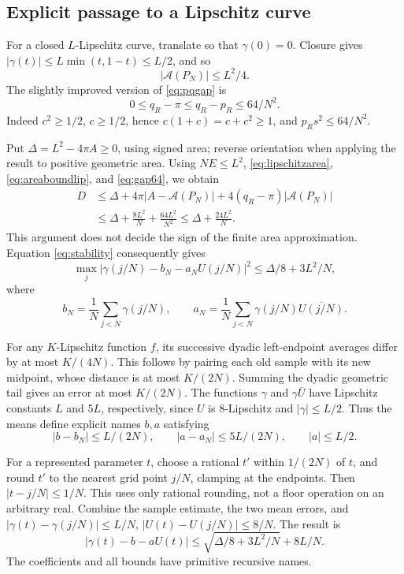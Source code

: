 \documentclass[11pt,a4paper]{article}
\theoremstyle{definition}
\newcommand{\Area}{\mathcal A}
\begin{document}
\subsection{Explicit passage to a Lipschitz curve}
For a closed \(L\)-Lipschitz curve, translate so that \(\gamma(0)=0\).
Closure gives \(|\gamma(t)|\le L\min(t,1-t)\le L/2\), and so
\[
 |\Area(P_N)|\le L^2/4.
 \tag{10.5}\label{eq:areaboundlip}
\]
The slightly improved version of \eqref{eq:pqgap} is
\[
 0\le q_R-\pi\le q_R-p_R\le64/N^2.
 \tag{10.6}\label{eq:gap64}
\]
Indeed \(c^2\ge1/2\), \(c\ge1/2\), hence
\(c(1+c)=c+c^2\ge1\), and \(p_Rs^2\le64/N^2\).

Put \(\Delta=L^2-4\pi A\ge0\), using signed area; reverse
orientation when applying the result to positive geometric area.
Using \(NE\le L^2\), \eqref{eq:lipschitzarea},
\eqref{eq:areaboundlip}, and \eqref{eq:gap64}, we obtain
\[
 \begin{aligned}
 D
 &\le\Delta+4\pi|A-\Area(P_N)|
       +4(q_R-\pi)|\Area(P_N)|\\
 &\le\Delta+\frac{8L^2}{N}+\frac{64L^2}{N^2}
 \le\Delta+\frac{24L^2}{N}.
 \end{aligned}
 \tag{10.7}\label{eq:Derror}
\]
This argument does not decide the sign of the finite area approximation.
Equation \eqref{eq:stability} consequently gives
\[
 \max_j|\gamma(j/N)-b_N-a_NU(j/N)|^2
 \le\Delta/8+3L^2/N,
 \tag{10.8}\label{eq:gridstability}
\]
where
\[
 b_N=\frac1N\sum_{j<N}\gamma(j/N),\qquad
 a_N=\frac1N\sum_{j<N}\gamma(j/N)\overline{U(j/N)}.
 \tag{10.9}\label{eq:means}
\]

For any \(K\)-Lipschitz function \(f\), its successive dyadic left-endpoint
averages differ by at most \(K/(4N)\). This follows by pairing each
old sample with its new midpoint, whose distance is at most \(K/(2N)\).
Summing the dyadic geometric tail gives an error at most \(K/(2N)\).
The functions \(\gamma\) and \(\gamma\overline U\) have Lipschitz
constants \(L\) and \(5L\), respectively, since \(U\) is
\(8\)-Lipschitz and \(|\gamma|\le L/2\).
Thus the means define explicit names \(b,a\) satisfying
\[
 |b-b_N|\le L/(2N),\qquad
 |a-a_N|\le5L/(2N),\qquad |a|\le L/2.
 \tag{10.10}\label{eq:meanerror}
\]

For a represented parameter \(t\), choose a rational \(t'\) within
\(1/(2N)\) of \(t\), and round \(t'\) to the nearest grid point
\(j/N\), clamping at the endpoints. Then \(|t-j/N|\le1/N\).
This uses only rational rounding, not a floor operation on an
arbitrary real. Combine the sample estimate, the two
mean errors, and
\(|\gamma(t)-\gamma(j/N)|\le L/N\),
\(|U(t)-U(j/N)|\le8/N\). The result is
\[
 \boxed{|\gamma(t)-b-aU(t)|
 \le\sqrt{\Delta/8+3L^2/N}+8L/N.}
 \tag{10.11}\label{eq:uniformstability}
\]
The coefficients and all bounds have primitive recursive names.
\end{document}
